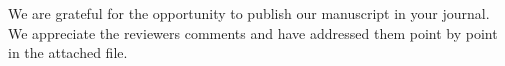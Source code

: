 We are grateful for the opportunity to publish our manuscript in your journal.
We appreciate the reviewers comments and have addressed them point by point in the attached file.